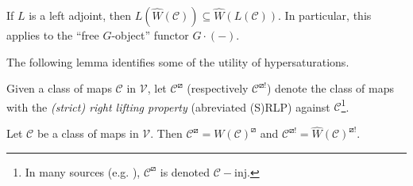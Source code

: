 \documentclass[a4paper,10pt,draft]{article}%
\begin{document}
\begin{remark}
      If $L$ is a left adjoint, then $L(\hat{W}(\mathcal C)) \subseteq \hat{W}(L(\mathcal C))$.
      In particular, this applies to the ``free $G$-object'' functor $G \cdot (-)$.
\end{remark}

The following lemma identifies some of the utility of hypersaturations.
\begin{notation}
      Given a class of maps $\mathcal C$ in $\mathcal V$, let $\mathcal C^\boxslash$ (respectively $\mathcal C^{\boxslash !}$)
      denote the class of maps with the
      \textit{(strict) right lifting property} (abreviated (S)RLP) against $\mathcal C$\footnote{
        In many sources (e.g. \cite{Hov99}), $\mathcal C^\boxslash$ is denoted $\mathcal C - \mbox{inj}$.
      }.
\end{notation}
\begin{lemma}
      \label{HYPER_LP_LEM}
      Let $\mathcal C$ be a class of maps in $\mathcal V$. Then
      $\mathcal C^{\boxslash}= W(\mathcal C)^{\boxslash}$
      and
      $\mathcal C^{\boxslash !} = \hat{W}(\mathcal C)^{\boxslash !}$.
\end{lemma}
\end{document}
